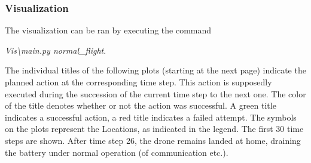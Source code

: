 \documentclass[12pt]{extarticle}
\begin{document}
\subsubsection*{Visualization}
The visualization can be ran by executing the command
\begin{center}
    \textit{Vis\textbackslash main.py normal\_flight}.
\end{center}
The individual titles of the following plots (starting at the next page) indicate the planned action at the corresponding time step. This action is supposedly executed during the succession of the current time step to the next one. The color of the title denotes whether or not the action was successful. A green title indicates a successful action, a red title indicates a failed attempt. The symbols on the plots represent the Locations, as indicated in the legend. The first 30 time steps are shown. After time step 26, the drone remains landed at home, draining the battery under normal operation (of communication etc.).
\clearpage
\begin{figure}[!htb]
  \centering
\end{figure}
\end{document}
